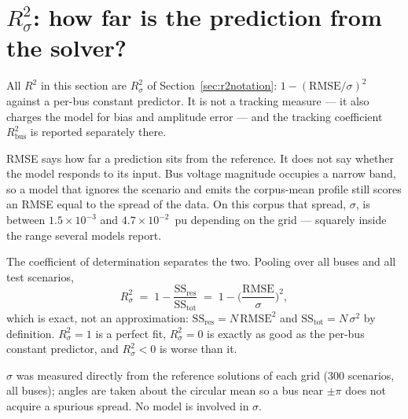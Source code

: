 \documentclass[10pt]{article}
\begin{document}
\section{$R^2_{\sigma}$: how far is the prediction from the solver?}

All $R^2$ in this section are $R^2_{\sigma}$ of
Section~\ref{sec:r2notation}: $1-(\mathrm{RMSE}/\sigma)^2$ against a per-bus
constant predictor.  It is not a tracking measure --- it also charges the model
for bias and amplitude error --- and the tracking coefficient
$R^2_{\mathrm{bus}}$ is reported separately there.


RMSE says how far a prediction sits from the reference. It does not say whether
the model responds to its input. Bus voltage magnitude occupies a narrow band,
so a model that ignores the scenario and emits the corpus-mean profile still
scores an RMSE equal to the spread of the data. On this corpus that spread,
$\sigma$, is between $1.5\times10^{-3}$ and $4.7\times10^{-2}$~pu depending on
the grid --- squarely inside the range several models report.

The coefficient of determination separates the two. Pooling over all buses and
all test scenarios,
\[
R^2_{\sigma} \;=\; 1 - \frac{\mathrm{SS}_{\text{res}}}{\mathrm{SS}_{\text{tot}}}
      \;=\; 1 - \Big(\frac{\text{RMSE}}{\sigma}\Big)^{2},
\]
which is exact, not an approximation: $\mathrm{SS}_{\text{res}} = N\,\text{RMSE}^2$
and $\mathrm{SS}_{\text{tot}} = N\,\sigma^2$ by definition.
$R^2_{\sigma} = 1$ is a perfect fit, $R^2_{\sigma} = 0$ is exactly as good as
the per-bus constant predictor, and $R^2_{\sigma} < 0$ is worse than it.

$\sigma$ was measured directly from the reference solutions of each grid (300
scenarios, all buses); angles are taken about the circular mean so a bus near
$\pm\pi$ does not acquire a spurious spread. No model is involved in $\sigma$.
\end{document}
